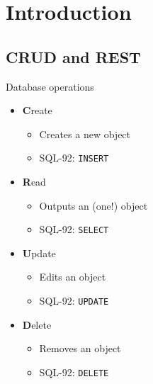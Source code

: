 \section{Introduction}


\subsection{CRUD and REST}


\begin{frame}{Database operations}
    \begin{itemize}
    \pause
    \item
        \textbf{C}reate
        \begin{itemize}
            \item Creates a new object
            \item SQL-92: \texttt{INSERT}
        \end{itemize}
    \pause
    \item
        \textbf{R}ead
        \begin{itemize}
            \item Outputs an (one!) object
            \item SQL-92: \texttt{SELECT}
        \end{itemize}
    \pause
    \item
        \textbf{U}pdate
        \begin{itemize}
            \item Edits an object
            \item SQL-92: \texttt{UPDATE}
        \end{itemize}
    \pause
    \item
        \textbf{D}elete
        \begin{itemize}
            \item Removes an object
            \item SQL-92: \texttt{DELETE}
        \end{itemize}
    \end{itemize}
\end{frame}


